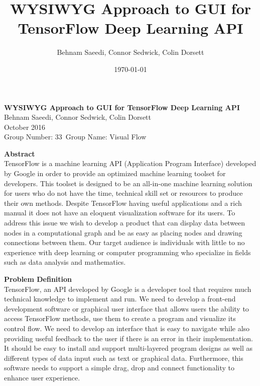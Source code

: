 \documentclass[a4paper,10pt]{IEEETran}
\title{WYSIWYG Approach to GUI for TensorFlow Deep Learning API}
\author{Behnam Saeedi, Connor Sedwick, Colin Dorsett}
\date{\today}
\newcommand*\Title{WYSIWYG Approach to GUI for TensorFlow Deep Learning API}
\newcommand*\Date{October 2016}
\newcommand*\Author{Behnam Saeedi, Connor Sedwick, Colin Dorsett}
\newcommand*\GroupNumber{Group Number: 33}
\newcommand*\GroupName{Group Name: Visual Flow}
\begin{document}
	\begin{titlepage}
		\vspace*{\fill}
			\begin{center}
				\noindent \textbf{\Huge\Title} \\
				\large\Author \\
				\large\Date \\
				\large\GroupNumber \, \large\GroupName
			\end{center}
			\noindent \textbf{Abstract} \\
			\indent TensorFlow is a machine learning API (Application Program Interface) developed by Google in order to provide an optimized machine learning toolset for developers.
			 This toolset is designed to be an all-in-one machine learning solution for users who do not have the time, technical skill set or resources to produce their own methods.
			 Despite TensorFlow having useful applications and a rich manual it does not have an eloquent visualization software for its users.
			 To address this issue we wish to develop a product that can display data between nodes in a computational graph and be as easy as placing nodes and drawing connections between them. Our target audience is individuals with little to no experience with deep learning or computer programming who specialize in fields such as data analysis and mathematics.\\
		\vspace*{\fill}
	\end{titlepage}

	\noindent \textbf{Problem Definition}\\
	\indent TensorFlow, an API developed by Google is a developer tool that requires much technical knowledge to implement and run.
	 We need to develop a front-end development software or graphical user interface that allows users the ability to access TensorFlow methods, use them to create a program and visualize its control flow.
	 We need to develop an interface that is easy to navigate while also providing useful feedback to the user if there is an error in their implementation.
	 It should be easy to install and support multi-layered program designs as well as different types of data input such as text or graphical data.
	 Furthermore, this software needs to support a simple drag, drop and connect functionality to enhance user experience.\\
\end{document}
